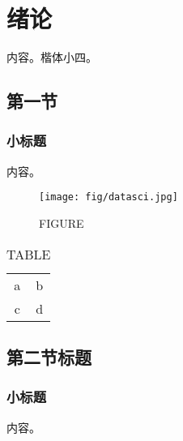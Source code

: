 \chapter{绪论} \label{chap:introduction}
内容。楷体小四。


\section{第一节}\label{sect:intro:bg}
\subsection{小标题}
内容\cite{rack-scale-join}。

\begin{figure}[htbp]
    \centering
    \texttt{[image: fig/datasci.jpg]}
    \caption{FIGURE}
    \label{fig:enter-label}
\end{figure}

\begin{table}[htbp]
    \centering
    \begin{tabular}{c|c}
        a & b \\
        c & d
    \end{tabular}
    \caption{TABLE}
    \label{tab:my_label}
\end{table}

\section{第二节标题}
\subsection{小标题}
内容。